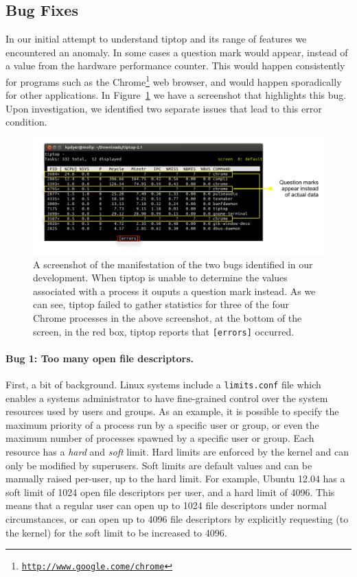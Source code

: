 \subsection{Bug Fixes}
In our initial attempt to understand tiptop and its range of features we encountered an anomaly.
In some cases a question mark would appear, instead of a value from the hardware performance counter.
This would happen consistently for programs such as the Chrome\footnote{\texttt{\url{http://www.google.come/chrome}}} web browser, and would happen sporadically for other applications.
In Figure~\ref{fig:tiptop-bug} we have a screenshot that highlights this bug.
Upon investigation, we identified two separate issues that lead to this error condition.
\begin{figure}[t]
\footnotesize
\centering
\includegraphics[width=.9\textwidth]{tiptop-bug}
\caption{\footnotesize A screenshot of the manifestation of the two bugs identified in our development. When tiptop is unable to determine the values associated with a process it ouputs a question mark instead. As we can see, tiptop failed to gather statistics for three of the four Chrome processes in the above screenshot, at the bottom of the screen, in the red box, tiptop reports that \texttt{[errors]} occurred.}
\label{fig:tiptop-bug}
\end{figure}

\paragraph{Bug 1: Too many open file descriptors.}
First, a bit of background. Linux systems include a \texttt{limits.conf} file which enables a systems administrator to have fine-grained control over the system resources used by users and groups.
As an example, it is possible to specify the maximum priority of a process run by a specific user or group, or even the maximum number of processes spawned by a specific user or group. Each resource has a \emph{hard} and \emph{soft} limit. Hard limits are enforced by the kernel and can only be modified by superusers. Soft limits are default values and can be manually raised per-user, up to the hard limit.
For example, Ubuntu 12.04 has a soft limit of 1024 open file descriptors per user, and a hard limit of 4096.
This means that a regular user can open up to 1024 file descriptors under normal circumstances, or can open up to 4096 file descriptors by explicitly requesting (to the kernel) for the soft limit to be increased to 4096.


